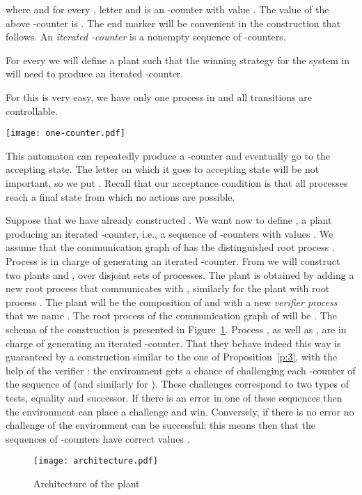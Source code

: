 \documentclass{llncs}
\renewenvironment{proof}{{\em Proof. }}{\nopagebreak
  \hspace*{\fill}}
\begin{document}
\begin{proof}
{where  and for every , letter  and
 is an -counter with value . The value of the above
-counter is .  The end marker
 will be convenient in the construction that follows.
An \emph{iterated -counter} is a nonempty sequence of
-counters.

\medskip For every  we will define a plant  such that the winning
strategy for the system in  will need to produce an iterated
-counter. 

\medskip For  this is very easy, we have only one
process in  and all transitions are controllable. 

\noindent\centerline{\texttt{[image: one-counter.pdf]}}

This automaton can repeatedly produce a -counter and eventually go
to the accepting state. The letter on which it goes to accepting state
will be not important, so we put . Recall that our acceptance
condition is that all processes reach a final state from which no
actions are possible.

Suppose that we have already constructed . We want now to
define , a plant producing an iterated -counter,
i.e., a sequence of -counters with values . We assume that the
communication graph of  has the distinguished root process . Process
 is in charge of generating an iterated -counter. From  we
will construct two plants  and , over disjoint sets
of processes. The plant  is obtained by adding a new root
process  that communicates with , similarly for the 
plant  with root process .  The plant
 will be the composition of  and  with a new
\emph{verifier process} that we name . The root process of the communication graph
of  will be . The schema of the
construction is presented in Figure~\ref{fig:architecture}. Process
, as well as , are in charge of generating an
iterated -counter. That they behave indeed this way is
guaranteed by a construction similar to the one of
Proposition~\ref{p:3}, with the help of the verifier :
 the
environment gets a chance of challenging each -counter of the
sequence of  (and similarly for ). These
challenges correspond to two types of tests, equality and
successor. If there is an error in one of these sequences then 
the environment can place a challenge and win. Conversely, if there is
no error no challenge of the environment can be successful; this means
then that the sequences of -counters have
correct values .

\begin{figure}[htbp]
  \centering
  \texttt{[image: architecture.pdf]}
  \caption{Architecture of the plant }
  \label{fig:architecture}
\end{figure}



}
\end{proof}
\end{document}
